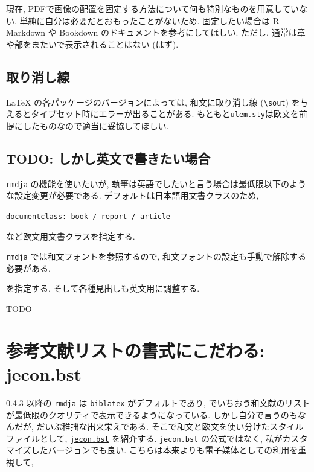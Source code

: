 \documentclass[
  xelatex,ja=standard,jafont=noto]{bxjsbook}
\theoremstyle{definition}
\theoremstyle{definition}
\theoremstyle{definition}
\theoremstyle{definition}
\theoremstyle{remark}
\begin{document}
現在,
PDFで画像の配置を固定する方法について何も特別なものを用意していない.
単純に自分は必要だとおもったことがないため. 固定したい場合は R Markdown
や Bookdown のドキュメントを参考にしてほしい. ただし,
通常は章や部をまたいで表示されることはない (はず).

\hypertarget{ux53d6ux308aux6d88ux3057ux7dda}{%
\section{取り消し線}\label{ux53d6ux308aux6d88ux3057ux7dda}}

LaTeX の各パッケージのバージョンによっては, 和文に取り消し線
(\texttt{\textbackslash{}sout})
を与えるとタイプセット時にエラーが出ることがある.
もともと\texttt{ulem.sty}は欧文を前提にしたものなので適当に妥協してほしい.

\hypertarget{todo-ux3057ux304bux3057ux82f1ux6587ux3067ux66f8ux304dux305fux3044ux5834ux5408}{%
\section{TODO:
しかし英文で書きたい場合}\label{todo-ux3057ux304bux3057ux82f1ux6587ux3067ux66f8ux304dux305fux3044ux5834ux5408}}

\texttt{rmdja} の機能を使いたいが,
執筆は英語でしたいと言う場合は最低限以下のような設定変更が必要である.
デフォルトは日本語用文書クラスのため,

\texttt{documentclass:\ book\ /\ report\ /\ article}

など欧文用文書クラスを指定する.

\texttt{rmdja} では和文フォントを参照するので,
和文フォントの設定も手動で解除する必要がある.

を指定する. そして各種見出しも英文用に調整する.

TODO

\hypertarget{ux53c2ux8003ux6587ux732eux30eaux30b9ux30c8ux306eux66f8ux5f0fux306bux3053ux3060ux308fux308b-jecon.bst}{%
\chapter{参考文献リストの書式にこだわる:
jecon.bst}\label{ux53c2ux8003ux6587ux732eux30eaux30b9ux30c8ux306eux66f8ux5f0fux306bux3053ux3060ux308fux308b-jecon.bst}}

0.4.3 以降の \texttt{rmdja} は \texttt{biblatex} がデフォルトであり,
でいちおう和文献のリストが最低限のクオリティで表示できるようになっている.
しかし自分で言うのもなんだが, だいぶ稚拙な出来栄えである.
そこで和文と欧文を使い分けたスタイルファイルとして,
\href{https://github.com/ShiroTakeda/jecon-bst}{\texttt{jecon.bst}}
を紹介する. \texttt{jecon.bst} の公式ではなく,
私がカスタマイズしたバージョンでも良い.
こちらは本来よりも電子媒体としての利用を重視して,
\end{document}
